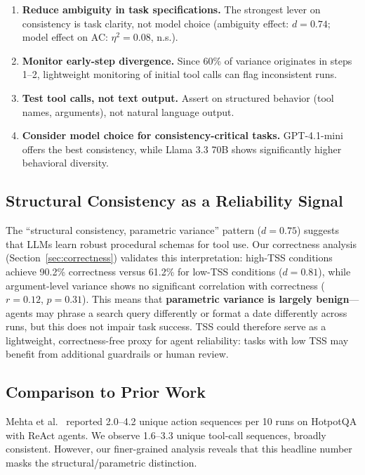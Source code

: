 \documentclass[letterpaper]{article}
\begin{document}
\begin{enumerate}[nosep]
    \item \textbf{Reduce ambiguity in task specifications.} The strongest lever on consistency is task clarity, not model choice (ambiguity effect: $d = 0.74$; model effect on AC: $\eta^2 = 0.08$, n.s.).
    \item \textbf{Monitor early-step divergence.} Since 60\% of variance originates in steps 1--2, lightweight monitoring of initial tool calls can flag inconsistent runs.
    \item \textbf{Test tool calls, not text output.} Assert on structured behavior (tool names, arguments), not natural language output.
    \item \textbf{Consider model choice for consistency-critical tasks.} GPT-4.1-mini offers the best consistency, while Llama 3.3 70B shows significantly higher behavioral diversity.
\end{enumerate}

\subsection{Structural Consistency as a Reliability Signal}

The ``structural consistency, parametric variance'' pattern ($d = 0.75$) suggests that LLMs learn robust procedural schemas for tool use. Our correctness analysis (Section~\ref{sec:correctness}) validates this interpretation: high-TSS conditions achieve 90.2\% correctness versus 61.2\% for low-TSS conditions ($d = 0.81$), while argument-level variance shows no significant correlation with correctness ($r = 0.12$, $p = 0.31$). This means that \textbf{parametric variance is largely benign}---agents may phrase a search query differently or format a date differently across runs, but this does not impair task success. TSS could therefore serve as a lightweight, correctness-free proxy for agent reliability: tasks with low TSS may benefit from additional guardrails or human review.

\subsection{Comparison to Prior Work}

Mehta et al.~\cite{mehta2026disagree} reported 2.0--4.2 unique action sequences per 10 runs on HotpotQA with ReAct agents. We observe 1.6--3.3 unique tool-call sequences, broadly consistent. However, our finer-grained analysis reveals that this headline number masks the structural/parametric distinction.
\end{document}
